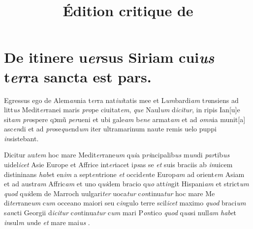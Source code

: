 \documentclass[12pt, a4paper]{book}
\newcommand{\styleabbr}[1]{\textit{#1}}
\begin{document}
 \title{Édition critique de} \maketitle		
			\beginnumbering
			
	
	
		
			
				
			
			
\chapter{ De itinere u\styleabbr{er}sus Siriam cui\styleabbr{us}
t\styleabbr{er}ra sancta est pars. }
				
	\pstart
	
Egressus ego de Alem\styleabbr{an}nia t\styleabbr{er}ra
nat\styleabbr{iui}tatis mee et
L\styleabbr{um}bardi\styleabbr{am} t\styleabbr{ra}nsiens ad
litt\styleabbr{us} Medit\styleabbr{er}ranei maris
\styleabbr{pro}pe ciuitat\styleabbr{em}, \styleabbr{que}
Naul\styleabbr{um} d\styleabbr{icitur}, in ripis Ian[u]e
sit\styleabbr{am} \styleabbr{pro}spere qↄmũ \styleabbr{per}ueni
et ubi gale\styleabbr{am} b\styleabbr{ene} armat\styleabbr{am}
et ad \styleabbr{omn}ia munit[a] asc\styleabbr{en}di et ad
\styleabbr{pro}se\styleabbr{que}nd\styleabbr{um} iter
ultramarinum naute remis uelo puppi \styleabbr{in}sistebant.
				
	\pend
	
				
	\pstart
	
Dicitur au\styleabbr{tem} hoc mare
Medit\styleabbr{er}rane\styleabbr{um} q\styleabbr{ui}a
p\styleabbr{ri}ncipalib\styleabbr{us} m\styleabbr{un}di
\styleabbr{par}tib\styleabbr{us} uidel\styleabbr{icet} Asie
Europe et Affrice int\styleabbr{er}iacet i\styleabbr{ps}as se
\styleabbr{et} suis braciis ab \styleabbr{in}uicem distininans
\styleabbr{habe}t en\styleabbr{im} a sept\styleabbr{en}trione
\styleabbr{et} occid\styleabbr{en}te Europ\styleabbr{am} ad
orient\styleabbr{em} Asiam et ad austr\styleabbr{am}
Affric\styleabbr{am} et uno q\styleabbr{ui}dem bracio
q\styleabbr{uo} att\styleabbr{in}git Hispani\styleabbr{am} et
strict\styleabbr{um} \styleabbr{quod} q\styleabbr{ui}dem de
Marroch uulgari\styleabbr{ter} uoca\styleabbr{tur}
c\styleabbr{on}tinua\styleabbr{tur} hoc mare Me
di\styleabbr{ter}rane\styleabbr{um} c\styleabbr{um} occeano
maiori seu c\styleabbr{in}gulo terre scil\styleabbr{icet} maximo
\styleabbr{quod} braci\styleabbr{um} s\styleabbr{an}cti Georgii
d\styleabbr{icitur} c\styleabbr{on}tinua\styleabbr{tur}
c\styleabbr{um} mari P\styleabbr{on}tico \styleabbr{quod}
q\styleabbr{ua}si null\styleabbr{am} \styleabbr{habe}t
\styleabbr{in}sul\styleabbr{m} \styleabbr{un}de \styleabbr{et}
mare mai\styleabbr{us} .
				
\end{document}

